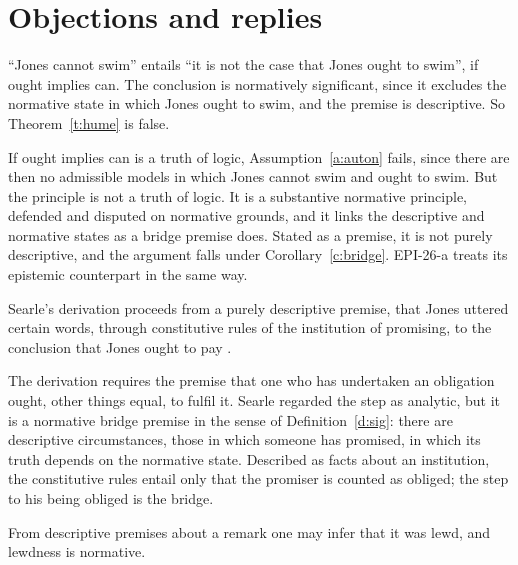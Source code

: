 \documentclass{situationist-preprint}
\begin{document}
\section{Objections and replies}

\begin{objection}
\enquote{Jones cannot swim} entails \enquote{it is not the case that Jones ought to swim}, if ought implies can. The conclusion is normatively significant, since it excludes the normative state in which Jones ought to swim, and the premise is descriptive. So Theorem~\ref{t:hume} is false.
\end{objection}

\begin{reply}
If ought implies can is a truth of logic, Assumption~\ref{a:auton} fails, since there are then no admissible models in which Jones cannot swim and ought to swim. But the principle is not a truth of logic. It is a substantive normative principle, defended and disputed on normative grounds, and it links the descriptive and normative states as a bridge premise does. Stated as a premise, it is not purely descriptive, and the argument falls under Corollary~\ref{c:bridge}. EPI-26-a treats its epistemic counterpart in the same way.
\end{reply}

\begin{objection}
Searle's derivation proceeds from a purely descriptive premise, that Jones uttered certain words, through constitutive rules of the institution of promising, to the conclusion that Jones ought to pay \citep{Searle1964}.
\end{objection}

\begin{reply}
The derivation requires the premise that one who has undertaken an obligation ought, other things equal, to fulfil it. Searle regarded the step as analytic, but it is a normative bridge premise in the sense of Definition~\ref{d:sig}: there are descriptive circumstances, those in which someone has promised, in which its truth depends on the normative state. Described as facts about an institution, the constitutive rules entail only that the promiser is counted as obliged; the step to his being obliged is the bridge.
\end{reply}

\begin{objection}
From descriptive premises about a remark one may infer that it was lewd, and lewdness is normative.
\end{objection}
\end{document}
